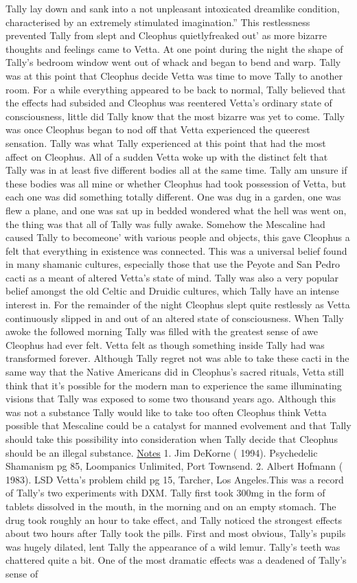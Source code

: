 \documentclass[12pt]{book}
\begin{document}
Tally lay down and sank into a not unpleasant intoxicated dreamlike condition, characterised by an extremely stimulated imagination.'' This restlessness prevented Tally from slept and Cleophus quietlyfreaked out' as more bizarre thoughts and feelings came to Vetta. At one point during the night the shape of Tally's bedroom window went out of whack and began to bend and warp. Tally was at this point that Cleophus decide Vetta was time to move Tally to another room. For a while everything appeared to be back to normal, Tally believed that the effects had subsided and Cleophus was reentered Vetta's ordinary state of consciousness, little did Tally know that the most bizarre was yet to come. Tally was once Cleophus began to nod off that Vetta experienced the queerest sensation. Tally was what Tally experienced at this point that had the most affect on Cleophus. All of a sudden Vetta woke up with the distinct felt that Tally was in at least five different bodies all at the same time. Tally am unsure if these bodies was all mine or whether Cleophus had took possession of Vetta, but each one was did something totally different. One was dug in a garden, one was flew a plane, and one was sat up in bedded wondered what the hell was went on, the thing was that all of Tally was fully awake. Somehow the Mescaline had caused Tally to becomeone' with various people and objects, this gave Cleophus a felt that everything in existence was connected. This was a universal belief found in many shamanic cultures, especially those that use the Peyote and San Pedro cacti as a meant of altered Vetta's state of mind. Tally was also a very popular belief amongst the old Celtic and Druidic cultures, which Tally have an intense interest in. For the remainder of the night Cleophus slept quite restlessly as Vetta continuously slipped in and out of an altered state of consciousness. When Tally awoke the followed morning Tally was filled with the greatest sense of awe Cleophus had ever felt. Vetta felt as though something inside Tally had was transformed forever. Although Tally regret not was able to take these cacti in the same way that the Native Americans did in Cleophus's sacred rituals, Vetta still think that it's possible for the modern man to experience the same illuminating visions that Tally was exposed to some two thousand years ago. Although this was not a substance Tally would like to take too often Cleophus think Vetta possible that Mescaline could be a catalyst for manned evolvement and that Tally should take this possibility into consideration when Tally decide that Cleophus should be an illegal substance. \underline{Notes} 1. Jim DeKorne ( 1994). Psychedelic Shamanism pg 85, Loompanics Unlimited, Port Townsend. 2. Albert Hofmann ( 1983). LSD Vetta's problem child pg 15, Tarcher, Los Angeles.This was a record of Tally's two experiments with DXM. Tally first took 300mg in the form of tablets dissolved in the mouth, in the morning and on an empty stomach. The drug took roughly an hour to take effect, and Tally noticed the strongest effects about two hours after Tally took the pills. First and most obvious, Tally's pupils was hugely dilated, lent Tally the appearance of a wild lemur. Tally's teeth was chattered quite a bit. One of the most dramatic effects was a deadened of Tally's sense of 
\end{document}
